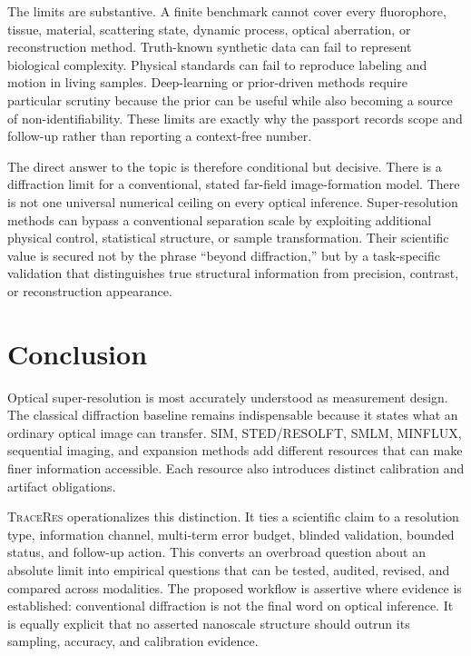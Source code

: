 \documentclass[conference]{IEEEtran}
\newcommand{\traceres}{\textsc{TraceRes}}
\begin{document}
The limits are substantive. A finite benchmark cannot cover every fluorophore, tissue, material, scattering state, dynamic process, optical aberration, or reconstruction method. Truth-known synthetic data can fail to represent biological complexity. Physical standards can fail to reproduce labeling and motion in living samples. Deep-learning or prior-driven methods require particular scrutiny because the prior can be useful while also becoming a source of non-identifiability. These limits are exactly why the passport records scope and follow-up rather than reporting a context-free number.

The direct answer to the topic is therefore conditional but decisive. There is a diffraction limit for a conventional, stated far-field image-formation model. There is not one universal numerical ceiling on every optical inference. Super-resolution methods can bypass a conventional separation scale by exploiting additional physical control, statistical structure, or sample transformation. Their scientific value is secured not by the phrase ``beyond diffraction,'' but by a task-specific validation that distinguishes true structural information from precision, contrast, or reconstruction appearance.

\section{Conclusion}

Optical super-resolution is most accurately understood as measurement design. The classical diffraction baseline remains indispensable because it states what an ordinary optical image can transfer. SIM, STED/RESOLFT, SMLM, MINFLUX, sequential imaging, and expansion methods add different resources that can make finer information accessible. Each resource also introduces distinct calibration and artifact obligations.

\traceres{} operationalizes this distinction. It ties a scientific claim to a resolution type, information channel, multi-term error budget, blinded validation, bounded status, and follow-up action. This converts an overbroad question about an absolute limit into empirical questions that can be tested, audited, revised, and compared across modalities. The proposed workflow is assertive where evidence is established: conventional diffraction is not the final word on optical inference. It is equally explicit that no asserted nanoscale structure should outrun its sampling, accuracy, and calibration evidence.
\end{document}
